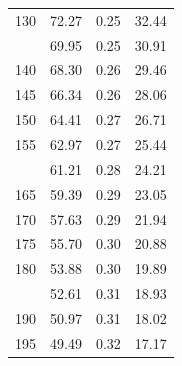 \documentclass[12pt]{article}
\begin{document}
\begin{minipage}{0.5\textwidth}
\begin{tabular}{rccc}
   130 & 72.27 & 0.25 & 32.44 \\  \addlinespace
   135 & 69.95 & 0.25 & 30.91 \\ 
   140 & 68.30 & 0.26 & 29.46 \\ 
   145 & 66.34 & 0.26 & 28.06 \\ 
   150 & 64.41 & 0.27 & 26.71 \\
   155 & 62.97 & 0.27 & 25.44 \\  \addlinespace
   160 & 61.21 & 0.28 & 24.21 \\ 
   165 & 59.39 & 0.29 & 23.05 \\ 
   170 & 57.63 & 0.29 & 21.94 \\ 
   175 & 55.70 & 0.30 & 20.88 \\
   180 & 53.88 & 0.30 & 19.89 \\  \addlinespace
   185 & 52.61 & 0.31 & 18.93 \\ 
   190 & 50.97 & 0.31 & 18.02 \\ 
   195 & 49.49 & 0.32 & 17.17 \\ 

\bottomrule
\end{tabular}

\end{minipage} \hfill
\end{document}

